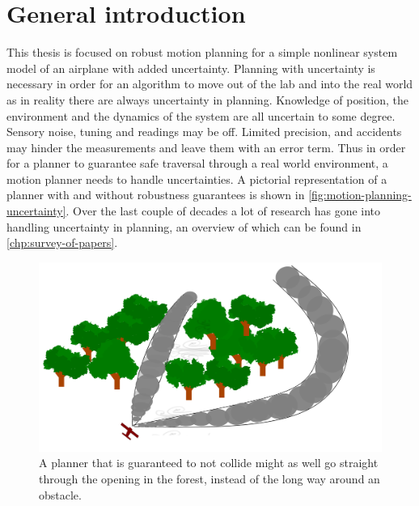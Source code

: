 \section{General introduction}

This thesis is focused on robust motion planning for a simple nonlinear system
model of an airplane with added uncertainty. Planning with uncertainty is
necessary in order for an algorithm to move out of the lab and into the real
world as in reality there are always uncertainty in planning. Knowledge of
position, the environment and the dynamics of the system are all uncertain to
some degree. Sensory noise, tuning and readings may be off. Limited precision,
and accidents may hinder the measurements and leave them with an error term.
Thus in order for a planner to guarantee safe traversal through a real world
environment, a motion planner needs to handle uncertainties. A pictorial
representation of a planner with and without robustness guarantees is shown in
\cref{fig:motion-planning-uncertainty}. Over the last couple of decades a lot of
research has gone into handling uncertainty in planning, an overview of which
can be found in \cref{chp:survey-of-papers}.

\begin{figure}[h]
  \centering
  \includegraphics[scale=0.1]{figures/experiments/aggressive-maneuver}
  \caption{A planner that is guaranteed to not collide might as well go straight
    through the opening in the forest, instead of the long way around an
    obstacle.}
  \label{fig:aggressive-maneuver}
\end{figure}

